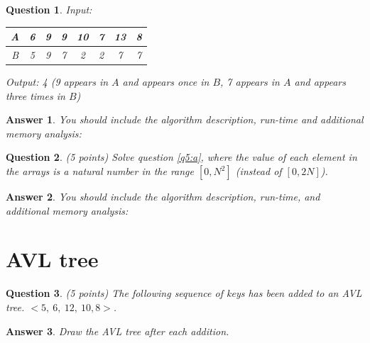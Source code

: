\documentclass[a4paper]{article}
\theoremstyle{remarksStyle}
\theoremstyle{questionStyle}
\newtheorem{question}{Question}
\theoremstyle{answerStyle}
\newtheorem{answer}{Answer}
\begin{document}
\begin{question}
\vspace{1cm}
Input:
\begin{tabular}{|c || c | c  | c | c | c | c | c ||} 
 \hline
 A & 6 & 9 & 9 & 10 & 7 & 13 & 8  \\ 
 \hline
 B & 5 & 9 & 7 & 2 & 2 & 7 & 7  \\ 
 \hline
\end{tabular}

\vspace{0.5cm}
Output:  4 \hspace{1cm} (\textit{9 appears in $A$ and appears once in $B$,  7 appears in $A$  and appears three times in $B$})










\end{question}

\vspace{0.5 cm}

\begin{answer}
    You should include the algorithm description, run-time and additional memory analysis:
\end{answer}

\vspace{0.75 cm}

\begin{question} \label{q6} (5 points)
Solve question \ref{q5:a}, where the value of each element in the arrays is a natural number in the range $[0,N^2]$ (instead of $[0, 2N]$).
\end{question}

\vspace{0.5 cm}

\begin{answer}
    You should include the algorithm description, run-time, and additional memory analysis:
\end{answer}

\newpage
\section{AVL tree}
\begin{question} (5 points)
The following sequence of keys has been added to an AVL tree.
$< 5, \ 6, \ 12, \ 10, 8 >$. 
\end{question}
\begin{answer}
Draw the AVL tree after each addition.

\end{answer}
\end{document}

